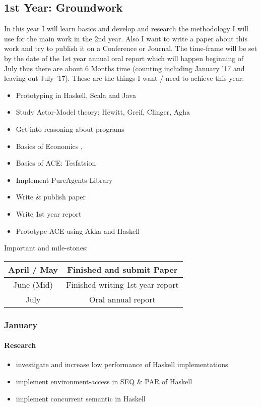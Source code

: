 \subsection{1st Year: Groundwork}
In this year I will learn basics and develop and research the methodology I will use for the main work in the 2nd year. Also I want to write a paper about this work and try to publish it on a Conference or Journal. The time-frame will be set by the date of the 1st year annual oral report which will happen beginning of July thus there are about 6 Months time (counting including January '17 and leaving out July '17). These are the things I want / need to achieve this year:

\begin{itemize}
\item Prototyping in Haskell, Scala and Java
\item Study Actor-Model theory: Hewitt, Greif, Clinger, Agha
\item Get into reasoning about programs
\item Basics of Economics \cite{bowles_understanding_2005}, \cite{kirman_complex_2010}
\item Basics of ACE: Tesfatsion
\item Implement PureAgents Library
\item Write \& publish paper
\item Write 1st year report
\item Prototype ACE using Akka and Haskell
\end{itemize}

Important and mile-stones:

\begin{center}
\begin{tabular}{ c|c } 
	April / May & Finished and submit Paper \\ 
	\hline
	June (Mid) & Finished writing 1st year report  \\ 
	\hline
	July & Oral annual report \\
\end{tabular}
\end{center}

\subsubsection{January}
\paragraph{Research} 
	\begin{itemize}
		\item investigate and increase low performance of Haskell implementations
		\item implement environment-access in SEQ \& PAR of Haskell
		\item implement concurrent semantic in Haskell
	\end{itemize}
		
